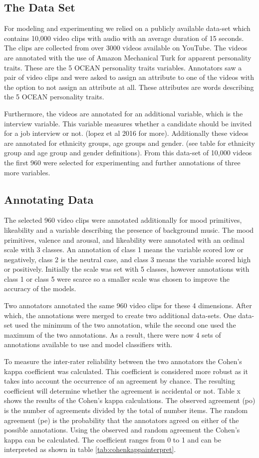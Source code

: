 \subsection{The Data Set}
For modeling and experimenting we relied on a publicly available data-set which contains 10,000 video clips with audio with an average duration of 15 seconds. The clips are collected from over 3000 videos available on YouTube. The videos are annotated with the use of Amazon Mechanical Turk for apparent personality traits. These are the 5 OCEAN personality traits variables. Annotators saw a pair of video clips and were asked to assign an attribute to one of the videos with the option to not assign an attribute at all. These attributes are words describing the 5 OCEAN personality traits. 

Furthermore, the videos are annotated for an additional variable, which is the interview variable. This variable measures whether a candidate should be invited for a job interview or not. (lopez et al 2016 for more). Additionally these videos are annotated for ethnicity groups, age groups and gender. (see table for ethnicity group and age group and gender definitions). From this data-set of 10,000 videos the first 960 were selected for experimenting and further annotations of three more variables. 

\subsection{Annotating Data}
The selected 960 video clips were annotated additionally for mood primitives, likeability and a variable describing the presence of background music. The mood primitives, valence and arousal, and likeability were annotated with an ordinal scale with 3 classes. An annotation of class 1 means the variable scored low or negatively, class 2 is the neutral case, and class 3 means the variable scored high or positively. Initially the scale was set with 5 classes, however annotations with class 1 or class 5 were scarce so a smaller scale was chosen to improve the accuracy of the models. 

Two annotators annotated the same 960 video clips for these 4 dimensions. After which, the annotations were merged to create two additional data-sets. One data-set used the minimum of the two annotation, while the second one used the maximum of the two annotations. As a result, there were now 4 sets of annotations available to use and model classifiers with.

To measure the inter-rater reliability between the two annotators the Cohen's kappa coefficient was calculated. This coefficient is considered more robust as it takes into account the occurrence of an agreement by chance. The resulting coefficient will determine whether the agreement is accidental or not. Table x shows the results of the Cohen's kappa calculations. The observed agreement (po) is the number of agreements divided by the total of number items. The random agreement (pe) is the probability that the annotators agreed on either of the possible annotations. Using the observed and random agreement the Cohen's kappa can be calculated. The coefficient ranges from 0 to 1 and can be interpreted as shown in table \ref{tab:cohenkappainterpret}.

